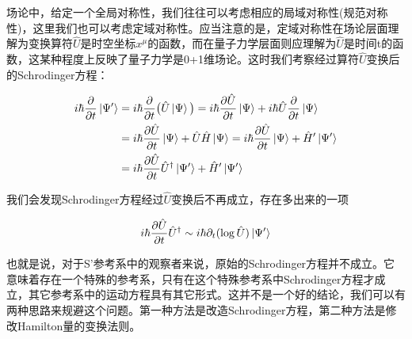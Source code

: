 \documentclass[a4paper]{article}
\begin{document}
        场论中，给定一个全局对称性，我们往往可以考虑相应的局域对称性(规范对称性)，这里我们也可以考虑定域对称性。应当注意的是，定域对称性在场论层面理解为变换算符$\hat{U}$是时空坐标$x^\mu$的函数，而在量子力学层面则应理解为$\hat{U}$是时间t的函数，这某种程度上反映了量子力学是0+1维场论。这时我们考察经过算符$\hat{U}$变换后的Schrodinger方程：

        \begin{equation}
            \begin{split}
                i\hbar\frac{\partial}{\partial t}\ket{\Psi'} &= i\hbar\frac{\partial}{\partial t}\big(\hat{U}\ket{\Psi}\big) = i\hbar\frac{\partial\hat{U}}{\partial t}\ket{\Psi} + i\hbar\hat{U}\frac{\partial}{\partial t}\ket{\Psi} \\
                    &= i\hbar\frac{\partial\hat{U}}{\partial t}\ket{\Psi} + \hat{U}\hat{H}\ket{\Psi} = i\hbar\frac{\partial\hat{U}}{\partial t}\ket{\Psi} + \hat{H}'\ket{\Psi'} \\
                    &= i\hbar\frac{\partial\hat{U}}{\partial t}\hat{U}^\dagger\ket{\Psi'} + \hat{H}'\ket{\Psi'}
            \end{split}
        \end{equation}
        
        我们会发现Schrodinger方程经过$\hat{U}$变换后不再成立，存在多出来的一项
        
        \begin{equation}
            i\hbar\frac{\partial\hat{U}}{\partial t}\hat{U}^\dagger\sim i\hbar\partial_t(\log\hat{U})\ket{\Psi'}
        \end{equation}

        也就是说，对于S'参考系中的观察者来说，原始的Schrodinger方程并不成立。它意味着存在一个特殊的参考系，只有在这个特殊参考系中Schrodinger方程才成立，其它参考系中的运动方程具有其它形式。这并不是一个好的结论，我们可以有两种思路来规避这个问题。第一种方法是改造Schrodinger方程，第二种方法是修改Hamilton量的变换法则。
\end{document}
